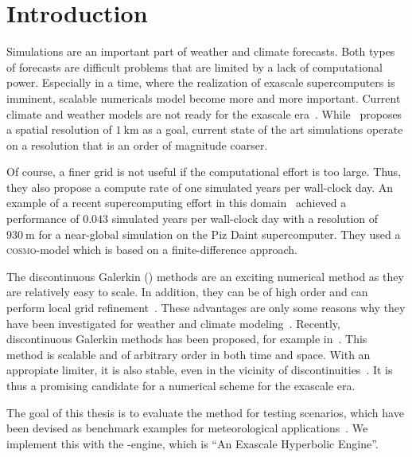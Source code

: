 \chapter{Introduction}\label{chap:introduction}
Simulations are an important part of weather and climate forecasts.
Both types of forecasts are difficult problems that are limited by a lack of computational power.
Especially in a time, where the realization of exascale supercomputers is imminent, scalable numericals model become more and more important.
Current climate and weather models are not ready for the exascale era~\cite{schulthess2018reflecting}.
While~\cite{schulthess2018reflecting} proposes a spatial resolution of $\SI{1}{\kilo\meter}$ as a goal, current state of the art simulations operate on a resolution that is an order of magnitude coarser.

Of course, a finer grid is not useful if the computational effort is too large.
Thus, they also propose a compute rate of one simulated years per wall-clock day.
An example of a recent supercomputing effort in this domain~\cite{fuhrer2018near} achieved a performance of 0.043 simulated years per wall-clock day with a resolution of $\SI{930}{\m}$ for a near-global simulation on the Piz Daint supercomputer.
They used a \textsc{cosmo}-model which is based on a finite-difference approach.

The discontinuous Galerkin (\dg{}) methods are an exciting numerical method as they are relatively easy to scale.
In addition, they can be of high order and can perform local grid refinement~\cite{hesthaven2008nodal}.
These advantages are only some reasons why they have been investigated for weather and climate modeling~\cite{muller2010adaptive,giraldo2008study}.
Recently, \ader{} discontinuous Galerkin methods has been proposed, for example in~\cite{dumbser2008unified}.
This method is scalable and of arbitrary order in both time and space.
With an appropiate limiter, it is also stable, even in the vicinity of discontinuities~\cite{dumbser2016simple}.
It is thus a promising candidate for a numerical scheme for the exascale era.

The goal of this thesis is to evaluate the \aderdg{} method for testing scenarios, which have been devised as benchmark examples for meteorological applications~\cite{robert1993bubble,giraldo2008study}.
We implement this with the \exahype{}-engine, which is \enquote{An Exascale Hyperbolic \pde{} Engine}.

